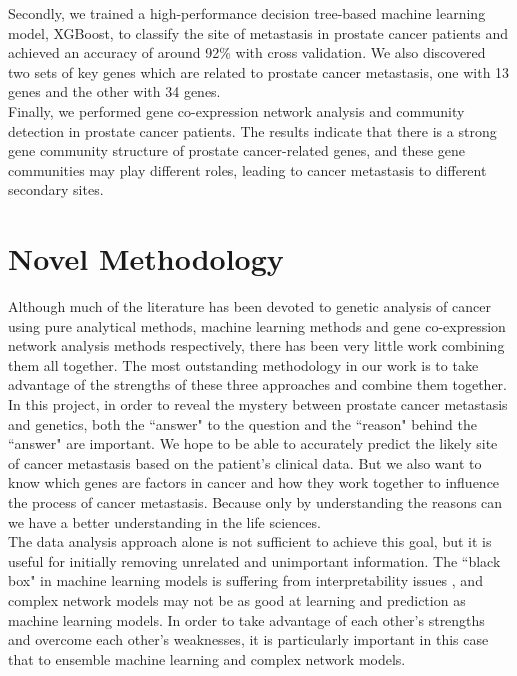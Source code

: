 \documentclass[12pt,a4paper]{report}
\begin{document}
Secondly, we trained a high-performance decision tree-based machine learning model, XGBoost, to classify the site of metastasis in prostate cancer patients and achieved an accuracy of around 92\% with cross validation. We also discovered two sets of key genes which are related to prostate cancer metastasis, one with 13 genes and the other with 34 genes.\\

Finally, we performed gene co-expression network analysis and community detection in prostate cancer patients. The results indicate that there is a strong gene community structure of prostate cancer-related genes, and these gene communities may play different roles, leading to cancer metastasis to different secondary sites.\\


\section{Novel Methodology }
Although much of the literature has been devoted to genetic analysis of cancer using pure analytical methods, machine learning methods and gene co-expression network analysis methods respectively, there has been very little work combining them all together. The most outstanding methodology in our work is to take advantage of the strengths of these three approaches and combine them together.\\

In this project, in order to reveal the mystery between prostate cancer metastasis and genetics, both the “answer" to the question and the “reason" behind the “answer" are important. We hope to be able to accurately predict the likely site of cancer metastasis based on the patient's clinical data. But we also want to know which genes are factors in cancer and how they work together to influence the process of cancer metastasis. Because only by understanding the reasons can we have a better understanding in the life sciences. \\

The data analysis approach alone is not sufficient to achieve this goal, but it is useful for initially removing unrelated and unimportant information. The “black box" in machine learning models is suffering from interpretability issues \cite{Jap98}, and complex network models may not be as good at learning and prediction as machine learning models. In order to take advantage of each other's strengths and overcome each other's weaknesses, it is particularly important in this case that to ensemble machine learning and complex network models. \\
\end{document}
